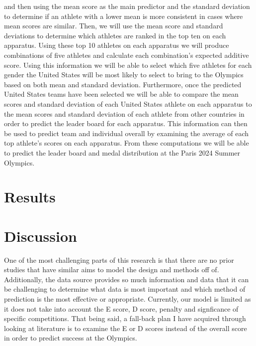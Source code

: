 \documentclass[12pt]{article}
\begin{document}
and then using the 
mean score as the main predictor and the standard deviation to determine if an athlete with a lower 
mean is more consistent in cases where mean scores are similar. Then, we will use the mean score and 
standard deviations to determine which athletes are ranked in the top ten on each apparatus. Using 
these top 10 athletes on each apparatus we will produce combinations of five athletes and calculate 
each combination's expected additive score. Using this information we will be able to select which 
five athletes for each gender the United States will be most likely to select to bring to the Olympics 
based on both mean and standard deviation. Furthermore, once the predicted United States teams have 
been selected we will be able to compare the mean scores and standard deviation of each United States 
athlete on each apparatus to the mean scores and standard deviation of each athlete from other countries 
in order to predict the leader board for each apparatus. This information can then be used to predict 
team and individual overall by examining the average of each top athlete's scores on each apparatus. 
From these computations we will be able to predict the leader board and medal distribution at the Paris 
2024 Summer Olympics.

\section{Results}
\label{sec:res}



\section{Discussion}
\label{sec:dis}

One of the most challenging parts of this research is that there are no prior studies that have similar
aims to model the design and methods off of. Additionally, the data source provides so much information
and data that it can be challenging to determine what data is most important and which method of prediction
is the most effective or appropriate. Currently, our model is limited as it does not take into account the 
E score, D score, penalty and signficance of specific competitions. That being said, a fall-back plan I have 
acquired through looking at literature is to examine the E or D scores instead of the overall score in order 
to predict success at the Olympics. 
\end{document}
